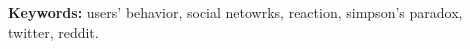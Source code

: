 \documentclass[11pt,twoside,a4paper]{book}
\begin{document}
\noindent \textbf{Keywords:} users' behavior, social netowrks, reaction, simpson's paradox, twitter, reddit.

\tableofcontents    %



\listoffigures            
\listoftables            

\mainmatter

\fancyhead[RE,LO]{\thesection}

\singlespacing              %
\hypersetup{pageanchor=true}
\end{document}
